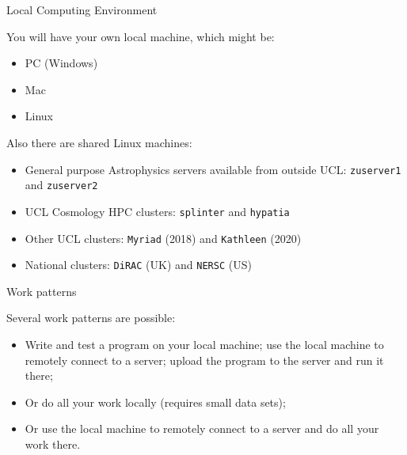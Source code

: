 \documentclass[dvipsnames]{beamer}
\newcommand{\server}[1]{\textcolor{BrickRed}{\texttt{#1}}}
\begin{document}
\begin{frame}{Local Computing Environment}
  \begin{block}{You will have your own local machine, which might be:}
    \begin{itemize}
      \item PC (Windows)
      \item Mac
      \item Linux
    \end{itemize}
  \end{block}
  \begin{block}{Also there are shared Linux machines:}
    \begin{itemize}
      \item General purpose Astrophysics servers available from outside UCL: \server{zuserver1} and \server{zuserver2}
      \item UCL Cosmology HPC clusters: \server{splinter} and \server{hypatia}
      \item Other UCL clusters: \server{Myriad} (2018) and \server{Kathleen} (2020)
      \item National clusters: \server{DiRAC} (UK) and \server{NERSC} (US)
    \end{itemize}
  \end{block}
\end{frame}


\begin{frame}{Work patterns}
  \begin{block}{Several work patterns are possible:}
    \begin{itemize}
      \item Write and test a program on your local machine; use the local machine to remotely connect to a server; upload the program to the server and run it there;
      \item Or do all your work locally (requires small data sets);
      \item Or use the local machine to remotely connect to a server and do all your work there.
    \end{itemize}
  \end{block}
\end{frame}
\end{document}
